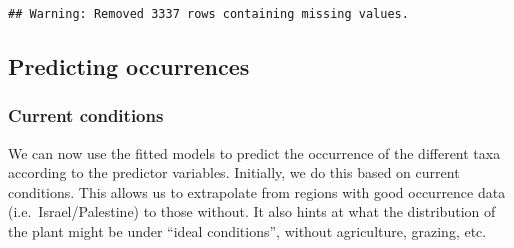\documentclass[]{article}
\newenvironment{Shaded}{\begin{snugshade}}{\end{snugshade}}
\newcommand{\DataTypeTok}[1]{\textcolor[rgb]{0.13,0.29,0.53}{#1}}
\newcommand{\KeywordTok}[1]{\textcolor[rgb]{0.13,0.29,0.53}{\textbf{#1}}}
\newcommand{\NormalTok}[1]{#1}
\newcommand{\OperatorTok}[1]{\textcolor[rgb]{0.81,0.36,0.00}{\textbf{#1}}}
\newcommand{\StringTok}[1]{\textcolor[rgb]{0.31,0.60,0.02}{#1}}
\begin{document}
\begin{verbatim}
## Warning: Removed 3337 rows containing missing values.
\end{verbatim}

\hypertarget{predicting-occurrences}{%
\subsection{Predicting occurrences}\label{predicting-occurrences}}

\hypertarget{current-conditions}{%
\subsubsection{Current conditions}\label{current-conditions}}

We can now use the fitted models to predict the occurrence of the
different taxa according to the predictor variables. Initially, we do
this based on current conditions. This allows us to extrapolate from
regions with good occurrence data (i.e.~Israel/Palestine) to those
without. It also hints at what the distribution of the plant might be
under ``ideal conditions'', without agriculture, grazing, etc.

\begin{Shaded}
\end{Shaded}

\begin{Shaded}
\end{Shaded}
\end{document}
